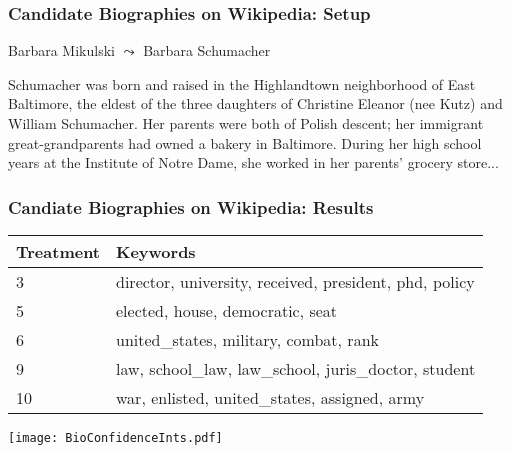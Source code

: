 \documentclass[xcolor=dvipsnames]{beamer}
\begin{document}
\begin{frame}
  \frametitle{Candidate Biographies on Wikipedia: Setup}

  Barbara Mikulski $\leadsto$ Barbara Schumacher {\tt

  Schumacher was born and raised in the Highlandtown neighborhood of East Baltimore, the eldest of the three daughters of Christine Eleanor (nee Kutz) and William Schumacher. Her parents were both of Polish descent; her immigrant great-grandparents had owned a bakery in Baltimore. During her high school years at the Institute of Notre Dame, she worked in her parents' grocery store...
  }

  \vspace{.25cm}

  \pause
  \pause
  \begin{itemize}
   \pause
   \pause
  \end{itemize}\smallskip
   \pause
\end{frame}

\begin{frame}
  \frametitle{Candiate Biographies on Wikipedia: Results}
  \vspace{.25cm}
  \begin{small}
  \centering
  \begin{tabular}{ll}
  \hline
  Treatment & Keywords\\
  \hline
  3 & director, university, received, president, phd, policy \\
  5 & elected, house, democratic, seat\\
  6 & united\_states, military, combat, rank \\
  9 & law, school\_law, law\_school, juris\_doctor, student \\
  10 & war, enlisted, united\_states, assigned, army \\
  \hline
  \end{tabular}
  \end{small}

  \begin{center}
  \texttt{[image: BioConfidenceInts.pdf]}
  \end{center}
\end{frame}
\end{document}
